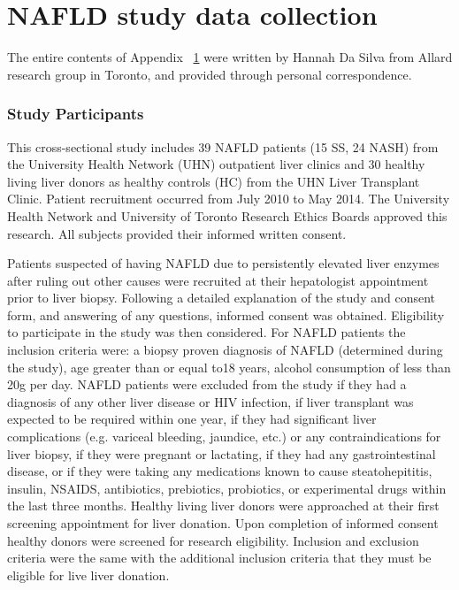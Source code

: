 \chapter{NAFLD study data collection}\label{AppB}

The entire contents of Appendix ~\ref{AppB} were written by Hannah Da Silva from Allard research group in Toronto, and provided through personal correspondence.

\subsection{Study Participants}
This cross-sectional study includes 39 NAFLD patients (15 SS, 24 NASH) from the University Health Network (UHN) outpatient liver clinics and 30 healthy living liver donors as healthy controls (HC) from the UHN Liver Transplant Clinic. Patient recruitment occurred from July 2010 to May 2014. The University Health Network and University of Toronto Research Ethics Boards approved this research. All subjects provided their informed written consent.

Patients suspected of having NAFLD due to persistently elevated liver enzymes after ruling out other causes were recruited at their hepatologist appointment prior to liver biopsy. Following a detailed explanation of the study and consent form, and answering of any questions, informed consent was obtained. Eligibility to participate in the study was then considered. For NAFLD patients the inclusion criteria were: a biopsy proven diagnosis of NAFLD (determined during the study), age greater than or equal to18 years, alcohol consumption of less than 20g per day. NAFLD patients were excluded from the study if they had a diagnosis of any other liver disease or HIV infection, if liver transplant was expected to be required within one year, if they had significant liver complications (e.g. variceal bleeding, jaundice, etc.) or any contraindications for liver biopsy, if they were pregnant or lactating, if they had any gastrointestinal disease, or if they were taking any medications known to cause steatohepititis, insulin, NSAIDS, antibiotics, prebiotics, probiotics, or experimental drugs within the last three months. Healthy living liver donors were approached at their first screening appointment for liver donation. Upon completion of informed consent healthy donors were screened for research eligibility. Inclusion and exclusion criteria were the same with the additional inclusion criteria that they must be eligible for live liver donation.

